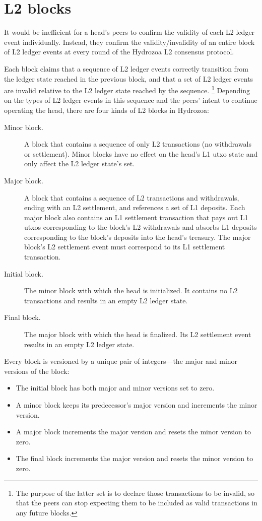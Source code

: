 \documentclass[../hydrozoa.tex]{subfiles}
\begin{document}
\chapter{L2 blocks}%
\label{h:l2-blocks}%

It would be inefficient for a head's peers to confirm the validity of each L2 ledger event individually.
Instead, they confirm the validity/invalidity of an entire block of L2 ledger events at every round of the Hydrozoa L2 consensus protocol.

Each block claims that a sequence of L2 ledger events correctly transition from the ledger state reached in the previous block, and that a set of L2 ledger events are invalid relative to the L2 ledger state reached by the sequence.%
\footnote{The purpose of the latter set is to declare those transactions to be invalid, so that the peers can stop expecting them to be included as valid transactions in any future blocks.}
Depending on the types of L2 ledger events in this sequence and the peers' intent to continue operating the head, there are four kinds of L2 blocks in Hydrozoa:
\begin{description}
  \item[Minor block.] A block that contains a sequence of only L2 transactions (no withdrawals or settlement).
    Minor blocks have no effect on the head's L1 utxo state and only affect the L2 ledger state's  set.
  \item[Major block.] A block that contains a sequence of L2 transactions and withdrawals, ending with an L2 settlement, and references a set of L1 deposits.
    Each major block also contains an L1 settlement transaction that pays out L1 utxos corresponding to the block's L2 withdrawals and absorbs L1 deposits corresponding to the block's deposits into the head's treasury.
    The major block's L2 settlement event must correspond to its L1 settlement transaction.
  \item[Initial block.] The minor block with which the head is initialized.
    It contains no L2 transactions and results in an empty L2 ledger state.
  \item[Final block.] The major block with which the head is finalized.
    Its L2 settlement event results in an empty L2 ledger state.
\end{description}

Every block is versioned by a unique pair of integers---the major and minor versions of the block:
\begin{itemize}
  \item The initial block has both major and minor versions set to zero.
  \item A minor block keeps its predecessor's major version and increments the minor version.
  \item A major block increments the major version and resets the minor version to zero.
  \item The final block increments the major version and resets the minor version to zero.
\end{itemize}
\end{document}
